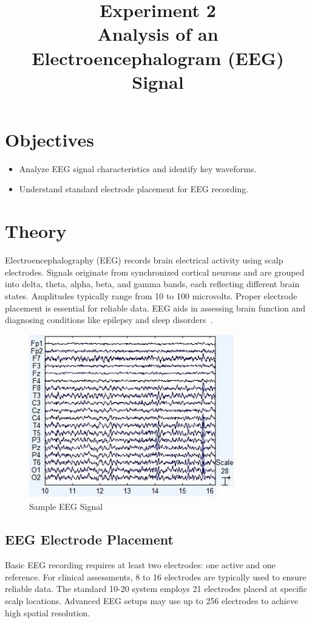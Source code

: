 \documentclass[11pt]{article}
\title{Experiment 2 \\
    \textbf{Analysis of an Electroencephalogram (EEG) Signal}}
\author{}
\date{}
\begin{document}


\pagebreak
\maketitle

\vspace{-6em}

\section*{Objectives}
\begin{itemize}
    \item Analyze EEG signal characteristics and identify key waveforms.
    \item Understand standard electrode placement for EEG recording.
\end{itemize}

\section*{Theory}
Electroencephalography (EEG) records brain electrical activity using scalp electrodes. Signals originate from synchronized cortical neurons and are grouped into delta, theta, alpha, beta, and gamma bands, each reflecting different brain states. Amplitudes typically range from 10 to 100 microvolts. Proper electrode placement is essential for reliable data. EEG aids in assessing brain function and diagnosing conditions like epilepsy and sleep disorders~\cite{siuly2016eeg}.

\begin{figure}[H]
    \centering
    \includegraphics[width=.5\textwidth]{eeg.jpg}
    \caption{Sample EEG Signal\cite{eeg}}
\end{figure}

\subsection*{EEG Electrode Placement}
Basic EEG recording requires at least two electrodes: one active and one reference. For clinical assessments, 8 to 16 electrodes are typically used to ensure reliable data. The standard 10-20 system employs 21 electrodes placed at specific scalp locations. Advanced EEG setups may use up to 256 electrodes to achieve high spatial resolution.
\end{document}
